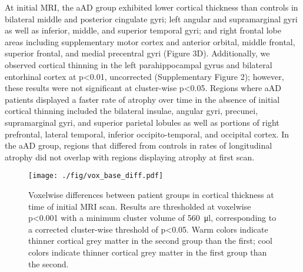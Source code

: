 \documentclass[]{article}
\begin{document}
At initial MRI, the aAD group exhibited lower cortical thickness than
controls in bilateral middle and posterior cingulate gyri; left angular
and supramarginal gyri as well as inferior, middle, and superior
temporal gyri; and right frontal lobe areas including supplementary
motor cortex and anterior orbital, middle frontal, superior frontal, and
medial precentral gyri (Figure 3D). Additionally, we observed cortical
thinning in the left parahippocampal gyrus and bilateral entorhinal
cortex at p\textless{}0.01, uncorrected (Supplementary Figure 2);
however, these results were not significant at cluster-wise
p\textless{}0.05. Regions where aAD patients displayed a faster rate of
atrophy over time in the absence of initial cortical thinning included
the bilateral insulae, angular gyri, precunei, supramarginal gyri, and
superior parietal lobules as well as portions of right prefrontal,
lateral temporal, inferior occipito-temporal, and occipital cortex. In
the aAD group, regions that differed from controls in rates of
longitudinal atrophy did not overlap with regions displaying atrophy at
first scan.

\begin{figure}[]

{\centering \texttt{[image: ./fig/vox\_base\_diff.pdf]} 

}

\caption[GM mean differences]{Voxelwise differences between patient groups in cortical thickness at time of initial MRI scan. Results are thresholded at voxelwise p<0.001 with a minimum cluster volume of \SI{560}{\micro\litre}, corresponding to a corrected cluster-wise threshold of p<0.05. Warm colors indicate thinner cortical grey matter in the second group than the first; cool colors indicate thinner cortical grey matter in the first group than the second. \label{gm_mean_diff}}

\end{figure}
\end{document}
